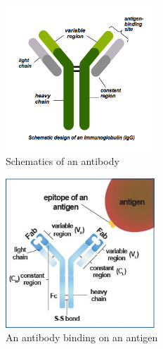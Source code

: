 \begin{frame}
    \begin{figure}
        \centering
        \includegraphics[width=0.5\textwidth]{../Images/schematics_antibody.png}
        \caption{Schematics of an antibody}
        \label{fig:schematics_antibody}
    \end{figure}
\end{frame}

\begin{frame}
    \begin{figure}
        \centering
        \includegraphics[width=0.5\textwidth]{../Images/antibody_on_antigen.jpg}
        \caption{An antibody binding on an antigen}
        \label{fig:antibody_on_antigen}
    \end{figure}
\end{frame}

